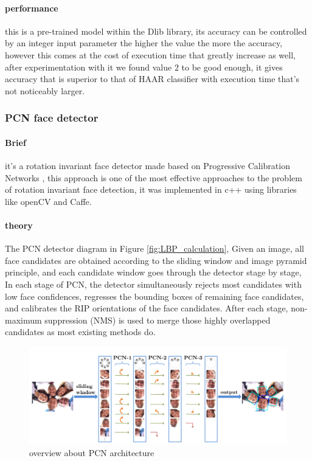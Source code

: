 \paragraph{performance}
this is a pre-trained model within the Dlib library, its accuracy can be controlled by an integer input parameter the higher the value the more the accuracy, however this comes at the cost of execution time that greatly increase as well, after experimentation with it we found value 2 to be good enough, it gives accuracy that is superior to that of HAAR classifier with execution time that's not noticeably larger.


\subsubsection{PCN face detector}
\paragraph{Brief}
it's a rotation invariant face detector made based on Progressive Calibration Networks \cite{PCN}, this approach is one of the most effective approaches to the problem of rotation invariant face detection, it was implemented in c++ using libraries like openCV and Caffe.
\paragraph{theory}
The PCN detector diagram in Figure \ref{fig:LBP_calculation}, Given an image, all face candidates are obtained according to the sliding window and image pyramid principle, and each candidate window goes through the detector stage by stage, In each stage of PCN, the detector simultaneously rejects most candidates with low face confidences, regresses the bounding boxes of remaining face candidates, and calibrates the RIP orientations of the face candidates. After each stage, non-maximum suppression (NMS) is used to merge those highly overlapped candidates as most existing methods do.
\begin{figure}
	\centering
	\includegraphics[width=\textwidth]{images/PCN_archOverview.png}
	\caption{overview about PCN architecture \cite{PCN}}
	\label{fig:PCN_archOverview}
\end{figure}
